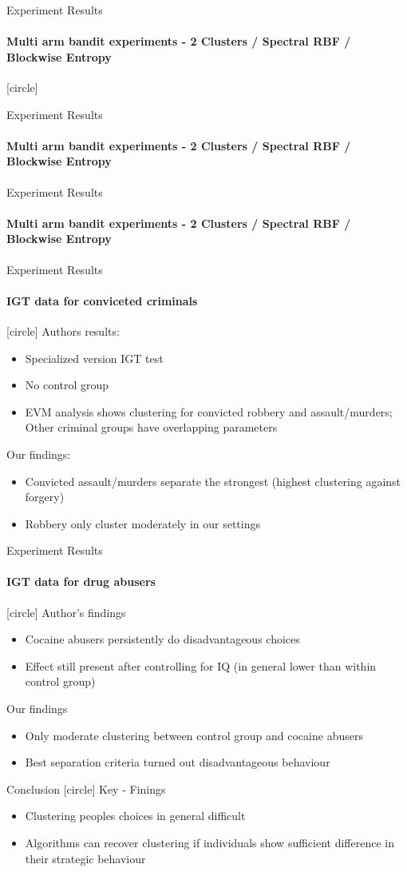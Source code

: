 \documentclass[11pt]{beamer}
\begin{document}
\begin{frame}{Experiment Results}
	\framesubtitle{Multi arm bandit experiments - 2 Clusters / Spectral RBF / Blockwise Entropy}
	[circle]
		\center
		
\end{frame}
	
\begin{frame}{Experiment Results}
	\framesubtitle{Multi arm bandit experiments - 2 Clusters / Spectral RBF / Blockwise Entropy}
	\center
	 
\end{frame}

\begin{frame}{Experiment Results}
	\framesubtitle{Multi arm bandit experiments - 2 Clusters / Spectral RBF / Blockwise Entropy}
	\center
	
\end{frame}


\begin{frame}{Experiment Results}
	\framesubtitle{IGT data for conviceted criminals}
	[circle]
	Authors results:
	\begin{itemize}
		\item Specialized version IGT test
		\item No control group
		\item EVM analysis shows clustering for convicted robbery and assault/murders; Other criminal groups have overlapping parameters
	\end{itemize}
		Our findings:
		\begin{itemize}
			\item Convicted assault/murders separate the strongest (highest clustering against forgery)
			\item Robbery only cluster moderately in our settings
		\end{itemize}
\end{frame}

\begin{frame}{Experiment Results}
	\framesubtitle{IGT data for drug abusers}
	[circle]
	Author's findings
	\begin{itemize}
		\item Cocaine abusers persistently do disadvantageous choices
		\item Effect still present after controlling for IQ (in general lower than within control group)
	\end{itemize}
	Our findings
	\begin{itemize}
		\item Only moderate clustering between control group and cocaine abusers
		\item Best separation criteria turned out disadvantageous behaviour
	\end{itemize}
\end{frame}


\begin{frame}{Conclusion}
	[circle]
	Key - Finings
	\begin{itemize}
		\item Clustering peoples choices in general difficult
		\item Algorithms can recover clustering if individuals show sufficient difference in their strategic behaviour
	\end{itemize}
	
\end{frame}
\end{document}
